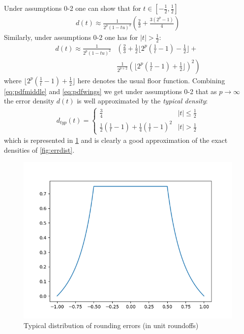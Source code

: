 \documentclass[10pt,conference]{IEEEtran}
\newcommand{\floor}[1]{\lfloor #1 \rfloor}
\newcommand{\absv}[1]{\vert #1\vert}
\begin{document}
Under assumptions 0-2 one can show that for $t\in\left[-\frac{1}{2},\frac{1}{2}\right]$
\begin{align}
d(t)\approx\frac{1}{2^p(1-tu)^2}\left(\frac{2}{3}+\frac{3(2^{p}-1)}{4}\right)\label{eq:pdfmiddle}
\end{align}
Similarly, under assumptions 0-2 one has for $\absv{t}>\frac{1}{2}$:
\begin{align}
d(t)\approx\frac{1}{2^p(1-tu)^2}& \left(\frac{2}{3}+\frac{1}{2}\floor{2^p(\frac{1}{t}-1)-\frac{1}{2}}+\right. \nonumber 
\\
&\left.\frac{1}{2^{p+2}}(\floor{2^p(\frac{1}{t}-1)+\frac{1}{2}})^2\right)\label{eq:pdfwings}
\end{align}
where $\floor{2^p(\frac{1}{t}-1)+\frac{1}{2}}$ here denotes the usual floor function.
Combining \cref{eq:pdfmiddle} and \cref{eq:pdfwings} we get under assumptions 0-2 that as $p\to\infty$ the error density $d(t)$ is well approximated by the \emph{typical density}:
\begin{align}
d_{typ}(t)=\begin{cases}
\frac{3}{4}&\absv{t}\leq\frac{1}{2}
\\
\frac{1}{2}\left(\frac{1}{t}-1\right)+\frac{1}{4}\left(\frac{1}{t}-1\right)^2 & \absv{t}>\frac{1}{2}
\end{cases}\label{eq:typicalpdf}
\end{align} 
which is represented in \cref{fig:typical} and is clearly a good approximation of the exact densities of \cref{fig:errdist}.
\begin{figure}[ht!]
\includegraphics[scale=0.55]{pics/typical_dist}
\caption{Typical distribution of rounding errors (in unit roundoffs)}
\label{fig:typical}
\end{figure}
\end{document}
